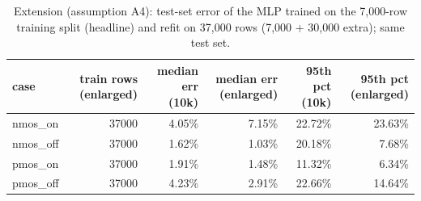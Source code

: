 \begin{table}[H]
\centering
{\small
\begin{tabular}{lrrrrr}
\toprule
case & train rows (enlarged) & median err (10k) & median err (enlarged) & 95th pct (10k) & 95th pct (enlarged) \\
\midrule
nmos\_on & 37000 & 4.05\% & 7.15\% & 22.72\% & 23.63\% \\
nmos\_off & 37000 & 1.62\% & 1.03\% & 20.18\% & 7.68\% \\
pmos\_on & 37000 & 1.91\% & 1.48\% & 11.32\% & 6.34\% \\
pmos\_off & 37000 & 4.23\% & 2.91\% & 22.66\% & 14.64\% \\
\bottomrule
\end{tabular}
}
\caption{Extension (assumption A4): test-set error of the MLP trained on the 7,000-row training split (headline) and refit on 37,000 rows (7,000 + 30,000 extra); same test set.}
\label{tab:enlarged}
\end{table}

